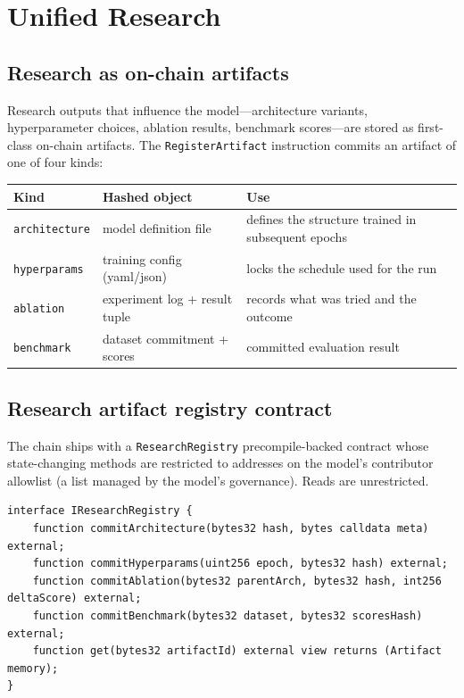\section{Unified Research}
\label{sec:research}

\subsection{Research as on-chain artifacts}

Research outputs that influence the model---architecture variants, hyperparameter choices, ablation results, benchmark scores---are stored as first-class on-chain artifacts. The \texttt{RegisterArtifact} instruction commits an artifact of one of four kinds:

\begin{longtable}{p{3cm}p{4cm}p{7cm}}
\toprule
\textbf{Kind} & \textbf{Hashed object} & \textbf{Use} \\
\midrule
\endhead
\texttt{architecture} & model definition file & defines the structure trained in subsequent epochs \\
\texttt{hyperparams} & training config (yaml/json) & locks the schedule used for the run \\
\texttt{ablation} & experiment log + result tuple & records what was tried and the outcome \\
\texttt{benchmark} & dataset commitment + scores & committed evaluation result \\
\bottomrule
\end{longtable}

\subsection{Research artifact registry contract}

The chain ships with a \texttt{ResearchRegistry} precompile-backed contract whose state-changing methods are restricted to addresses on the model's contributor allowlist (a list managed by the model's governance). Reads are unrestricted.

\begin{lstlisting}[language=Solidity,caption=Registry interface (excerpt)]
interface IResearchRegistry {
    function commitArchitecture(bytes32 hash, bytes calldata meta) external;
    function commitHyperparams(uint256 epoch, bytes32 hash) external;
    function commitAblation(bytes32 parentArch, bytes32 hash, int256 deltaScore) external;
    function commitBenchmark(bytes32 dataset, bytes32 scoresHash) external;
    function get(bytes32 artifactId) external view returns (Artifact memory);
}
\end{lstlisting}

